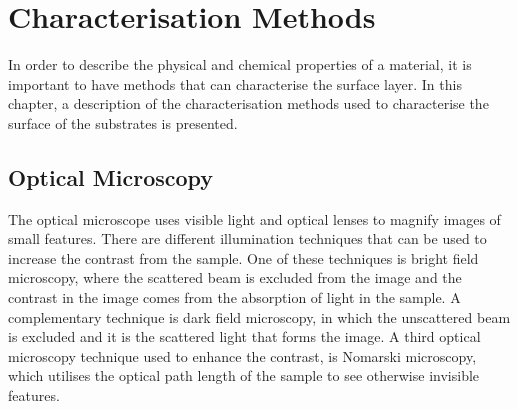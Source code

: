 \chapter{Characterisation Methods}\label{ch:methods}

In order to describe the physical and chemical properties of a material, it is important to have methods that can characterise the surface layer. In this chapter, a description of the characterisation methods used to characterise the surface of the substrates is presented.


\section{Optical Microscopy}

The optical microscope uses visible light and optical lenses to magnify images of small features. There are different illumination techniques that can be used to increase the contrast from the sample. One of these techniques is bright field microscopy, where the scattered beam is excluded from the image and the contrast in the image comes from the absorption of light in the sample. A complementary technique is dark field microscopy, in which the unscattered beam is excluded and it is the scattered light that forms the image. A third optical microscopy technique used to enhance the contrast, is Nomarski microscopy, which utilises the optical path length of the sample to see otherwise invisible features.

